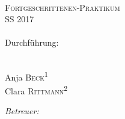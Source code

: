 \begin{titlepage}
	\par
	\par
\begin{center}
\ \\
[5.5cm]	
	\textsc{\Huge Fortgeschrittenen-Praktikum} \\
[0.5cm]
	{\Huge SS 2017} \\
[1.5cm]
	\Huge\textbf{\Versuch} \\
[1cm]
	{\large Durchführung: \Tag} \\
	{\large \Korrektur} \\
[4.5cm]
\begin{minipage}{0.4\textwidth}
	\begin{flushleft} \large
		Anja \textsc{Beck}\textsuperscript{1} \\
		Clara \textsc{Rittmann}\textsuperscript{2}
	\end{flushleft}
\end{minipage}
\hfill
\begin{minipage}{0.4\textwidth}
	\begin{flushright} \large
		\emph{Betreuer:} \\
		\Betreuer
	\end{flushright}
\end{minipage}
\end{center}
\end{titlepage}